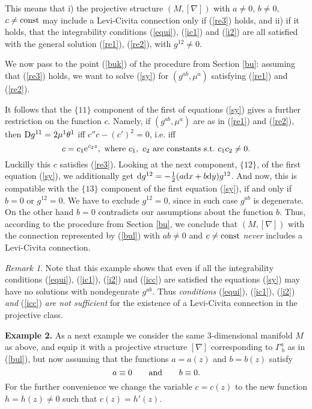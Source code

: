 \documentclass[letterpaper]{amsart}
\theoremstyle{definition}
\theoremstyle{remark}
\newtheorem{remark}[theorem]{Remark}
\newcommand{\D}{{\rm D}}
\newcommand{\der}{{\rm d}}
\begin{document}
This means that i) the projective structure $(M,[\nabla])$ with $a\neq
0$, $b\neq 0$, $c\neq {\rm const}$ may include a Levi-Civita
connection only if (\ref{re3}) holds, and ii) if it holds, that the
integrability conditions (\ref{equi}), (\ref{ic1}) and
(\ref{i2}) are all satisfied with the general solution (\ref{re1}),
(\ref{re2}), with $g^{12}\neq 0$. 

We now pass to the point (\ref{buk}) of the procedure from Section
\ref{bu}: assuming that (\ref{re3})
holds, we want to solve (\ref{sy}) for $(g^{ab},\mu^a)$ satisfying (\ref{re1}) and (\ref{re2}).

It follows that the $\{11\}$ component of the first of equations
(\ref{sy}) gives a further restriction on the function $c$. Namely, if
$(g^{ab},\mu^a)$ are as in (\ref{re1}) and (\ref{re2}), then 
$\D g^{11}=2\mu^1\theta^1$ iff $c''c-(c')^2=0$, i.e. iff 
$$c=c_1{\rm e}^{c_2z},~{\rm where}~ c_1,~
c_2~{\rm are~constants~s.t.}~ c_1c_2\neq 0.$$
Luckilly this $c$ satisfies (\ref{re3}). Looking at the next
component, $\{12\}$, 
of the first equation (\ref{sy}), we additionally get $\der g^{12}=-\tfrac12
(a\der x+b\der y)g^{12}$. And now, this is compatible with the
$\{13\}$ component of the first equation (\ref{sy}), if and only if
$b=0$ or $g^{12}=0$. We have to exclude $g^{12}=0$, since in such case
$g^{ab}$ is degenerate. On the other hand $b=0$ contradicts 
our assumptions about the function 
$b$. Thus, according to the procedure from Section \ref{bu}, we
conclude that $(M,[\nabla])$ with the connection represented by
(\ref{bul}) with $ab\neq 0$ and $c\neq {\rm const}$ \emph{never} includes a Levi-Civita connection.
\begin{remark}\label{bull}
Note that this example shows that even if all the integrability
conditions (\ref{equi}), (\ref{ic1}), (\ref{i2}) and (\ref{icc}) are
satisfied the equations (\ref{sy}) may have no solutions with
nondegenrate $g^{ab}$. Thus \emph{conditions} (\ref{equi}), (\ref{ic1}),
(\ref{i2}) \emph{and} (\ref{icc}) \emph{are not sufficient} for the existence of
a Levi-Civita connection in the projective class.     
\end{remark}
{\bf Example 2.}
As a next example we consider the same 3-dimensional manifold $M$ as
above, and equip it with a 
projective structure $[\nabla]$ corresponding to $\Gamma^a_{~b}$ as 
in (\ref{bul}), but now assuming that 
the functions $a=a(z)$ and $b=b(z)$ satisfy 
$$a\equiv 0\quad\quad{\rm and}\quad\quad b\equiv 0.$$
For the further convenience we change the variable $c=c(z)$ to the new
function $h=h(z)\neq 0$ such that $c(z)=h'(z)$. 
\end{document}
